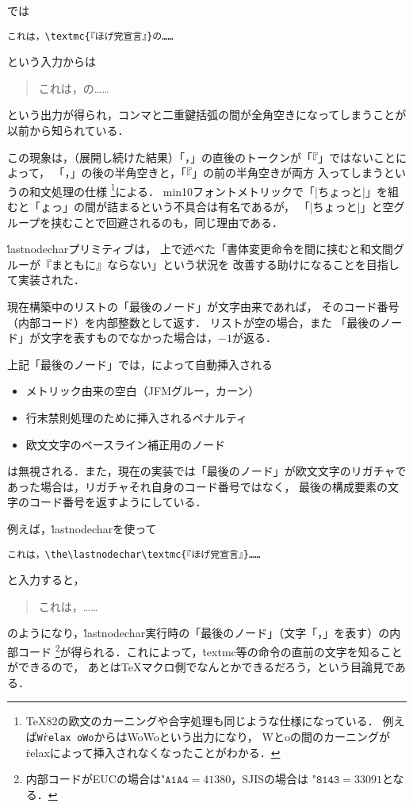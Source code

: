 \documentclass[a4paper,11pt,nomag,dvipdfmx]{jsarticle}
\begin{document}
\pTeX では
\begin{verbatim}
これは，\textmc{『ほげ党宣言』}の……
\end{verbatim}
という入力からは
\begin{quote}
これは，の……
\end{quote}
という出力が得られ，コンマと二重鍵括弧の間が全角空きになってしまうことが以前から知られている．

この現象は，（展開し続けた結果）「，」の直後のトークンが「『」ではないことによって，
「，」の後の半角空きと，「『」の前の半角空きが両方
入ってしまうという\pTeX の和文処理の仕様
\footnote{%
  \TeX82の欧文のカーニングや合字処理も同じような仕様になっている．
  例えば\texttt{W\.{relax}\ oWo}からはW\relax oWoという出力になり，
  Wとoの間のカーニングが\.{relax}によって挿入されなくなったことがわかる．
}による．
min10フォントメトリックで「|ちょっと|」を組むと「ょっ」の間が詰まるという不具合は有名であるが，
「|ちょ{}っと|」と空グループを挟むことで回避されるのも，同じ理由である．

\medskip

\.{lastnodechar}プリミティブは，
上で述べた「書体変更命令を間に挟むと和文間グルーが『まともに』ならない」という状況を
改善する助けになることを目指して実装された．

\begin{cslist}
  現在構築中のリストの「最後のノード」が文字由来であれば，
  そのコード番号（内部コード）を内部整数として返す．
  リストが空の場合，また
  「最後のノード」が文字を表すものでなかった場合は，$-1$が返る．

  上記「最後のノード」では，\pTeX によって自動挿入される
  \begin{itemize}
    \item メトリック由来の空白（JFMグルー，カーン）
    \item 行末禁則処理のために挿入されるペナルティ
    \item 欧文文字のベースライン補正用のノード
  \end{itemize}
  は無視される．また，現在の実装では「最後のノード」が欧文文字のリガチャで
  あった場合は，リガチャそれ自身のコード番号ではなく，
  最後の構成要素の文字のコード番号を返すようにしている．
\end{cslist}

例えば，\.{lastnodechar}を使って
\begin{verbatim}
これは，\the\lastnodechar\textmc{『ほげ党宣言』}……
\end{verbatim}
と入力すると，
\begin{quote}
これは，\the\lastnodechar{}……
\end{quote}
のようになり，\.{lastnodechar}実行時の「最後のノード」（文字「，」を表す）の内部コード
\footnote{%
  内部コードがEUCの場合は$\texttt{"A1A4} = 41380$，SJISの場合は
  $\texttt{"8143} = 33091$となる．
}が得られる．これによって，\.{textmc}等の命令の直前の文字を知ることができるので，
あとは\TeX マクロ側でなんとかできるだろう，という目論見である．
\end{document}
